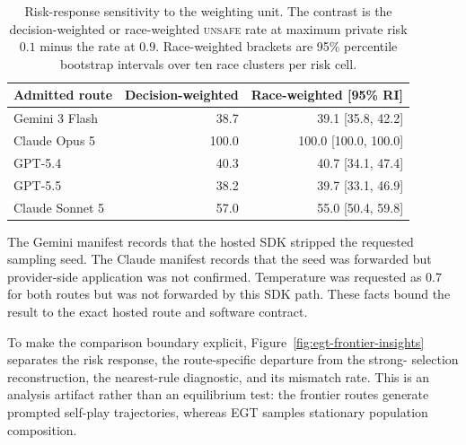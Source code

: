 \documentclass[sigconf,anonymous]{aamas}
\newcommand{\Unsafe}{\textsc{unsafe}}
\begin{document}
\begin{table}[h]
    \caption{Risk-response sensitivity to the weighting unit. The contrast is
    the decision-weighted or race-weighted \Unsafe{} rate at maximum private
    risk $0.1$ minus the rate at $0.9$. Race-weighted brackets are 95\%
    percentile bootstrap intervals over ten race clusters per risk cell.}
    \label{tab:baseline-race-sensitivity}
    \centering
    \scriptsize
    \begin{tabular}{@{}lrr@{}}
        \toprule
        Admitted route & Decision-weighted & Race-weighted [95\% RI] \\
        \midrule
        Gemini 3 Flash & 38.7 & 39.1 [35.8, 42.2] \\
        Claude Opus 5 & 100.0 & 100.0 [100.0, 100.0] \\
        GPT-5.4 & 40.3 & 40.7 [34.1, 47.4] \\
        GPT-5.5 & 38.2 & 39.7 [33.1, 46.9] \\
        Claude Sonnet 5 & 57.0 & 55.0 [50.4, 59.8] \\
        \bottomrule
    \end{tabular}
\end{table}

The Gemini manifest records that the hosted SDK stripped the requested
sampling seed. The Claude manifest records that the seed was forwarded but
provider-side application was not confirmed. Temperature was requested as
0.7 for both routes but was not forwarded by this SDK path. These facts bound
the result to the exact hosted route and software contract.

To make the comparison boundary explicit, Figure~\ref{fig:egt-frontier-insights}
separates the risk response, the route-specific departure from the strong-
selection reconstruction, the nearest-rule diagnostic, and its mismatch
rate. This is an analysis artifact rather than an equilibrium test: the
frontier routes generate prompted self-play trajectories, whereas EGT samples
stationary population composition.
\end{document}
